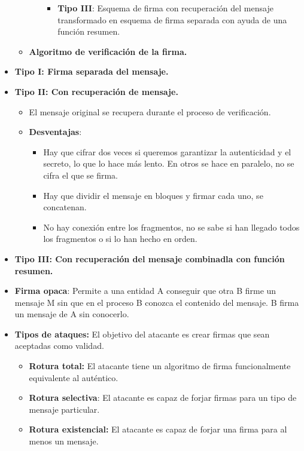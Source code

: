\documentclass[12pt, twoside, openright]{report} %
\begin{document}
\begin{itemize}
\begin{itemize}
\begin{itemize}
\begin{itemize}
				                  \item \textbf{Tipo III}: Esquema de firma con recuperación del mensaje transformado en esquema de firma separada con ayuda de una función resumen.
			                  \end{itemize}
		            \end{itemize}
		      \item \textbf{Algoritmo de verificación de la firma.}
	      \end{itemize}
	\item \textbf{Tipo I: Firma separada del mensaje.}
	\item \textbf{Tipo II: Con recuperación de mensaje.}
	      \begin{itemize}
		      \item El mensaje original se recupera durante el proceso de verificación.
		      \item \textbf{Desventajas}:
		            \begin{itemize}
			            \item Hay que cifrar dos veces si queremos garantizar la autenticidad y el secreto, lo que lo hace más lento. En otros se hace en paralelo, no se cifra el que se firma.
			            \item Hay que dividir el mensaje en bloques y firmar cada uno, se concatenan.
			            \item No hay conexión entre los fragmentos, no se sabe si han llegado todos los fragmentos o si lo han hecho en orden.
		            \end{itemize}
	      \end{itemize}
	\item \textbf{Tipo III: Con recuperación del mensaje combinadla con función resumen.}
	\item \textbf{Firma opaca}: Permite a una entidad A conseguir que otra B firme un mensaje M sin que en el proceso B conozca el contenido del mensaje. B firma un mensaje de A sin conocerlo.
	\item \textbf{Tipos de ataques:} El objetivo del atacante es crear firmas que sean aceptadas como validad.
	      \begin{itemize}
		      \item \textbf{Rotura total:} El atacante tiene un algoritmo de firma funcionalmente equivalente al auténtico.
		      \item \textbf{Rotura selectiva}: El atacante es capaz de forjar firmas para un tipo de mensaje particular.
		      \item \textbf{Rotura existencial:} El atacante es capaz de forjar una firma para al menos un mensaje.

\end{itemize}
\end{itemize}
\end{document}
